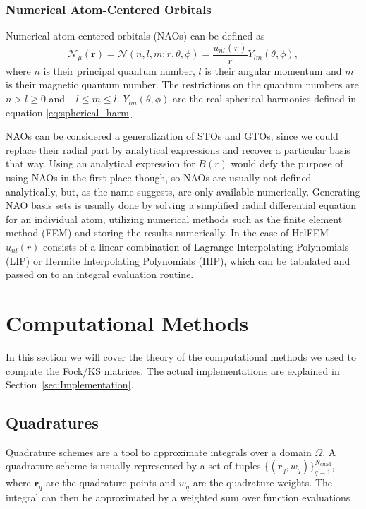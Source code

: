 \documentclass{article}
\begin{document}
\subsubsection{Numerical Atom-Centered Orbitals}\label{subsubsec:nao}
Numerical atom-centered orbitals (NAOs) can be defined as
\begin{equation}
  \mathcal N_\mu(\mathbf r)= \mathcal N (n,l,m;r,\theta,\phi) =
  \frac{u_{nl}(r)}{r}Y_{lm}(\theta,\phi),
\end{equation}
where $n$ is their principal quantum number, $l$ is their angular
momentum and $m$ is their magnetic quantum number. The restrictions on
the quantum numbers are $n>l\geq0$ and $-l\leq m \leq l$.
$Y_{lm}(\theta,\phi)$ are the real spherical harmonics
defined in equation \eqref{eq:spherical_harm}.\cite{Lehtola2019}

NAOs can be considered a generalization of STOs and GTOs, since we
could replace their radial part by analytical expressions and recover
a particular basis that way.\cite{Lehtola2019b} Using an analytical
expression for $B(r)$ would defy the purpose of using NAOs in the
first place though, so NAOs are usually not defined analytically,
but, as the name suggests, are only available numerically. Generating
NAO basis sets is usually done by solving a simplified radial
differential equation
for an individual atom, utilizing numerical methods such as the finite
element method (FEM) and storing the results
numerically.\cite{Blum_2009,Lehtola2019,Lehtola2019a,Lehtola2023b} In
the case of HelFEM $u_{nl}(r)$ consists of a linear
combination of Lagrange Interpolating Polynomials
(LIP)\cite{Lehtola2019, Lehtola2019a} or Hermite Interpolating
Polynomials (HIP)\cite{Lehtola2023b}, which can be tabulated and passed on to an
integral evaluation routine.

\section{Computational Methods} \label{sec:comp_methods}
In this section we will cover the theory of the computational methods
we used to compute the Fock/KS matrices. The actual implementations
are explained in Section~\ref{sec:Implementation}.

\subsection{Quadratures}\label{subsec:quadratures}
Quadrature schemes are a tool to approximate integrals over a domain
$\Omega$. A quadrature scheme is usually represented by a set of
tuples $\{(\mathbf r_q, w_q)\}_{q=1}^{N_{\text{quad}}}$, where
$\mathbf r_q$ are the quadrature points and $w_q$ are the quadrature
weights. The integral can then be approximated by a weighted sum over
function evaluations
\end{document}
